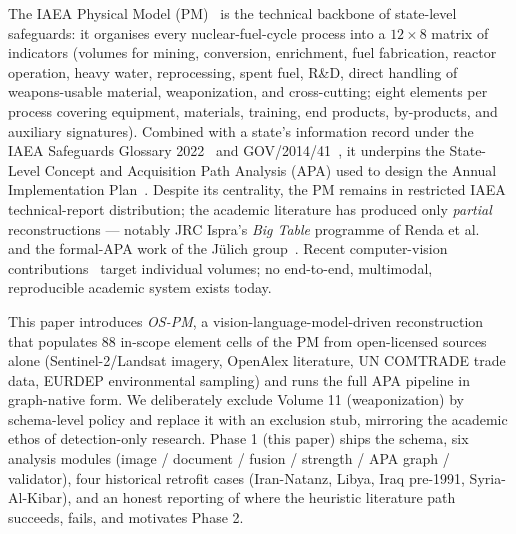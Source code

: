 \documentclass[11pt,a4paper]{article}
\begin{document}
The IAEA Physical Model (PM)~\cite{LiuMorsy1999} is the technical
backbone of state-level safeguards: it organises every nuclear-fuel-cycle
process into a $12 \times 8$ matrix of indicators (volumes for mining,
conversion, enrichment, fuel fabrication, reactor operation, heavy water,
reprocessing, spent fuel, R\&D, direct handling of weapons-usable
material, weaponization, and cross-cutting; eight elements per process
covering equipment, materials, training, end products, by-products, and
auxiliary signatures). Combined with a state's information record under
the IAEA Safeguards Glossary 2022~\cite{IAEAGlossary2022} and
GOV/2014/41~\cite{IAEAGov201441}, it underpins the State-Level Concept
and Acquisition Path Analysis (APA) used to design the Annual
Implementation Plan~\cite{Listner2013,Allen2021}. Despite its centrality,
the PM remains in restricted IAEA technical-report distribution; the
academic literature has produced only \emph{partial} reconstructions ---
notably JRC Ispra's \emph{Big Table} programme of
Renda et al.~\cite{Renda2014,Renda2015} and the formal-APA work of the
J\"ulich group~\cite{Listner2013,Allen2021}. Recent computer-vision
contributions~\cite{Gastelum2024,Elliott2023} target individual
volumes; no end-to-end, multimodal, reproducible academic system
exists today.

This paper introduces \emph{OS-PM}, a vision-language-model-driven
reconstruction that populates 88 in-scope element cells of the PM from
open-licensed sources alone (Sentinel-2/Landsat imagery, OpenAlex
literature, UN COMTRADE trade data, EURDEP environmental sampling) and
runs the full APA pipeline in graph-native form. We deliberately exclude
Volume 11 (weaponization) by schema-level policy and replace it with an
exclusion stub, mirroring the academic ethos of detection-only research.
Phase 1 (this paper) ships the schema, six analysis modules
(image / document / fusion / strength / APA graph / validator), four
historical retrofit cases (Iran-Natanz, Libya, Iraq pre-1991,
Syria-Al-Kibar), and an honest reporting of where the heuristic
literature path succeeds, fails, and motivates Phase 2.
\end{document}
